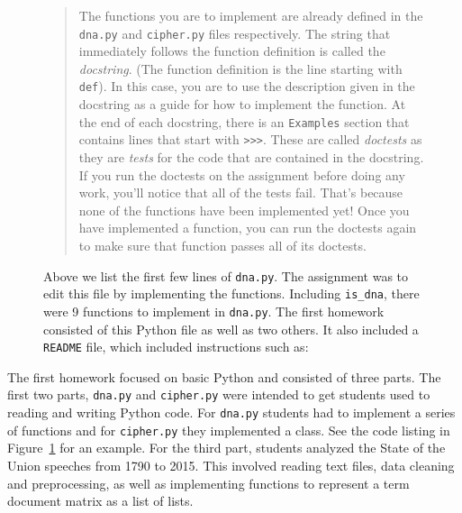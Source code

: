 \begin{figure}
\centering

\caption{Above we list the first few lines of \texttt{dna.py}.
The assignment was to edit this file by implementing the functions.
Including \texttt{is\_dna}, there were 9 functions
to implement in \texttt{dna.py}.
The first homework consisted of this Python file as well as two others.
It also included a \texttt{README} file, which included instructions
such as:}\label{fig:dna}
\begin{quotation}
The functions you are to implement are already defined in the \texttt{dna.py} and
\texttt{cipher.py} files respectively. The string that immediately follows the function
definition is called the \emph{docstring}. (The function definition is the line
starting with \texttt{def}). In this case, you are to use the description given in the
docstring as a guide for how to implement the function. At the end of each
docstring, there is an \texttt{Examples} section that contains lines that start with
\verb|>>>|. These are called \emph{doctests} as they are \emph{tests} for the code that are
contained in the docstring. If you run the doctests on the assignment before
doing any work, you'll notice that all of the tests fail. That's because none
of the functions have been implemented yet! Once you have implemented a
function, you can run the doctests again to make sure that function passes all
of its doctests.
\end{quotation}
\end{figure}

The first homework focused on basic Python and consisted of three parts.
The first two parts, \texttt{dna.py} and \texttt{cipher.py}
were intended to get students used to reading and writing Python code.
For \texttt{dna.py} students had to implement a series of functions and for
\texttt{cipher.py} they implemented a class.
See the code listing in Figure~\ref{fig:dna} for an example.
For the third part, students analyzed the State of the Union
speeches from 1790 to 2015.
This involved reading text files, data cleaning and preprocessing, as well
as implementing functions to represent a term document matrix as a list of
lists.


